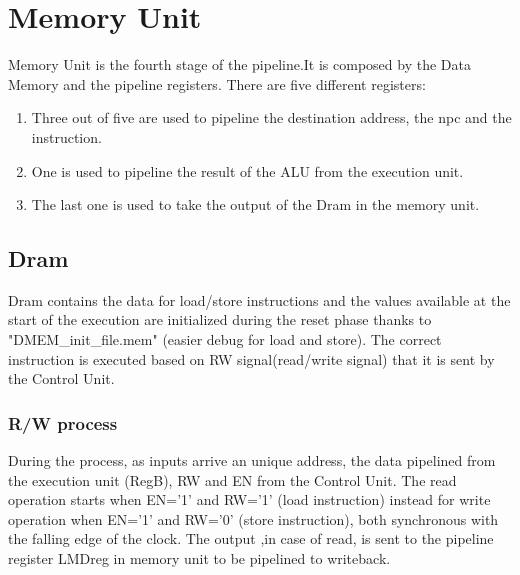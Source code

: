 \chapter{Memory Unit}
\label{Memory Unit}
Memory Unit is the fourth stage of the pipeline.It is composed by the Data Memory and the pipeline registers. There are five different registers:
\begin{enumerate} 
    \item Three out of five are used to pipeline the destination address, the npc and the instruction.
    \item One is used to pipeline the result of the ALU from the execution unit.
    \item The last one is used to take the output of the Dram in the memory unit.
\end{enumerate} 
\section{Dram}
Dram contains the data for load/store instructions and the values available at the start of the execution are initialized during the reset phase thanks to "DMEM\_init\_file.mem" (easier debug for load and store).
The correct instruction is executed based on RW signal(read/write signal) that it is sent by the Control Unit.
\subsection{R/W process}
During the process,  as inputs arrive an unique address, the data pipelined from the execution unit (RegB), RW and EN from the Control Unit. The read operation starts 
when EN='1' and RW='1' (load instruction) instead for write operation when EN='1' and RW='0' (store instruction), both synchronous with the falling edge of the clock.
The output ,in case of read, is sent to the pipeline register LMDreg in memory unit to be pipelined to writeback.